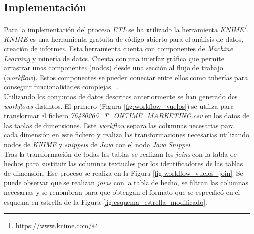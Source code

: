 \documentclass{article}
\begin{document}
\newpage
\subsection{Implementación}

Para la implementación del proceso \textit{ETL} se ha utilizado la herramienta \textit{KNIME\footnote{\url{https://www.knime.com/}}}. \textit{KNIME} es una herramienta gratuita de código abierto para el análisis de datos, creación de informes. Esta herramienta cuenta con componentes de \textit{Machine Learning} y minería de datos. Cuenta con una interfaz gráfica que permite arrastrar unos componentes (nodos) desde una sección al flujo de trabajo (\textit{workflow}). Estos componentes se pueden conectar entre ellos como tuberías para conseguir funcionalidades complejas ~\cite{KNIME}.\\

Utilizando los conjuntos de datos descritos anteriormente se han generado dos \textit{workflows} distintos. El primero (Figura \ref{fig:workflow_vuelos}) se utiliza para transformar el fichero \textit{76480265\_T\_ONTIME\_MARKETING.csv} en los datos de las tablas de dimensiones. Este \textit{workflow} separa las columnas necesarias para cada dimensión en este fichero y realiza las transformaciones necesarias utilizando nodos de \textit{KNIME} y \textit{snippets} de \textit{Java} con el nodo \textit{Java Snippet}.\\
Tras la transformación de todas las tablas se realizan los \textit{joins} con la tabla de hechos para sustituir las columnas textuales por los identificadores de las tablas de dimensión. Ese proceso se realiza en la Figura  \ref{fig:workflow_vuelos_join}. Se puede observar que se realizan \textit{joins} con la tabla de hecho, se filtran las columnas necesarias y se renombran para que obtengan el formato que se especificó en el esquema en estrella de la Figura \ref{fig:esquema_estrella_modificado}.\\
\end{document}
